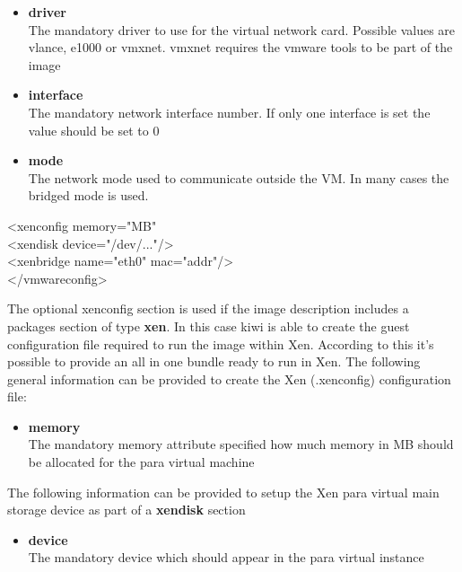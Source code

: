 \begin{itemize}
\item \textbf{driver}\\
      The mandatory driver to use for the virtual network card. Possible
      values are vlance, e1000 or vmxnet. vmxnet requires the vmware tools to be
      part of the image
\item \textbf{interface}\\
      The mandatory network interface number. If only one interface is
      set the value should be set to 0
\item \textbf{mode}\\
      The network mode used to communicate outside the VM. In many cases
      the bridged mode is used.
\end{itemize}

\begin{Command}{12cm}
<xenconfig memory="MB"\\
\hspace*{1cm}<xendisk device="/dev/..."/>\\
\hspace*{1cm}<xenbridge name="eth0" mac="addr"/>\\
</vmwareconfig>
\end{Command}

The optional xenconfig section is used if the image description
includes a packages section of type \textbf{xen}. In this case kiwi
is able to create the guest configuration file required to run the
image within Xen. According to this it's possible to provide an all
in one bundle ready to run in Xen. The following general information
can be provided to create the Xen (.xenconfig) configuration file:

\begin{itemize}
\item \textbf{memory}\\
      The mandatory memory attribute specified how much memory in MB
      should be allocated for the para virtual machine    
\end{itemize}

The following information can be provided to setup the Xen para virtual
main storage device as part of a \textbf{xendisk} section

\begin{itemize}
\item \textbf{device}\\
      The mandatory device which should appear in the para virtual
      instance
\end{itemize}

